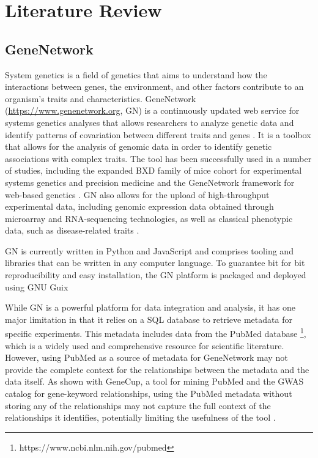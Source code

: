 \chapter{Literature Review}
\section{GeneNetwork}
System genetics is a field of genetics that aims to understand how the interactions between genes, the environment, and other factors contribute to an organism's traits and characteristics.  GeneNetwork (\url{https://www.genenetwork.org}, GN) is a continuously updated web service for systems genetics analyses that allows researchers to analyze genetic data and identify patterns of covariation between different traits and genes \citep{mulligan2017genenetwork}.  It is a toolbox that allows for the analysis of genomic data in order to identify genetic associations with complex traits. The tool has been successfully used in a number of studies, including the expanded BXD family of mice cohort for experimental systems genetics and precision medicine \citep{Ashbrook:2019} and the GeneNetwork framework for web-based genetics \citep{sloan2016genenetwork}.  GN also allows for the upload of high-throughput experimental data, including genomic expression data obtained through microarray and RNA-sequencing technologies, as well as classical phenotypic data, such as disease-related traits \citep{Anderson:2021}.

GN is currently written in Python and JavaScript and comprises tooling and libraries that can be written in any computer language.  To guarantee bit for bit reproducibility and easy installation, the GN platform is packaged and deployed using GNU Guix \citep{sloan2016genenetwork}

While GN is a powerful platform for data integration and analysis, it has one major limitation in that it relies on a SQL database to retrieve metadata for specific experiments.  This metadata includes data from the PubMed database \footnote{https://www.ncbi.nlm.nih.gov/pubmed}, which is a widely used and comprehensive resource for scientific literature.  However, using PubMed  as a source of metadata for GeneNetwork may not provide the complete context for the relationships between the metadata and the data itself.  As shown with GeneCup, a tool for mining PubMed and the GWAS catalog for gene-keyword relationships, using the PubMed metadata without storing any of the relationships may not capture the full context of the relationships it identifies, potentially limiting the usefulness of the tool \citep{gunturkun2022genecup}.

